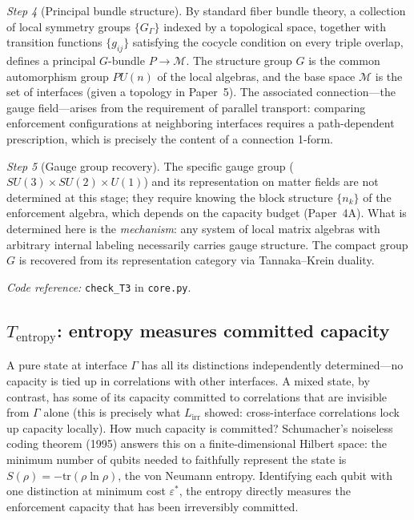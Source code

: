 \documentclass[11pt]{article}
\newcommand{\coderef}[2]{\smallskip\noindent\textit{Code reference:} \texttt{#1} in \texttt{#2}.}
\begin{document}
\begin{tcolorbox}[apfbox, title={T3: $L_{\mathrm{loc}}$ (Locality) $\to$ Gauge Structure}]
\textit{Step 4} (Principal bundle structure).  By standard fiber bundle theory, a collection of local symmetry groups $\{G_\Gamma\}$ indexed by a topological space, together with transition functions $\{g_{ij}\}$ satisfying the cocycle condition on every triple overlap, defines a principal $G$-bundle $P \to \mathcal{M}$.  The structure group $G$ is the common automorphism group $PU(n)$ of the local algebras, and the base space $\mathcal{M}$ is the set of interfaces (given a topology in Paper~5).  The associated connection---the gauge field---arises from the requirement of parallel transport: comparing enforcement configurations at neighboring interfaces requires a path-dependent prescription, which is precisely the content of a connection 1-form.

\textit{Step 5} (Gauge group recovery).  The specific gauge group ($SU(3) \times SU(2) \times U(1)$) and its representation on matter fields are not determined at this stage; they require knowing the block structure $\{n_k\}$ of the enforcement algebra, which depends on the capacity budget (Paper~4A).  What is determined here is the \emph{mechanism}: any system of local matrix algebras with arbitrary internal labeling necessarily carries gauge structure.  The compact group $G$ is recovered from its representation category via Tannaka--Krein duality.

\coderef{check\_T3}{core.py}
\end{tcolorbox}


\subsection{\texorpdfstring{$T_{\mathrm{entropy}}$}{T entropy}: entropy measures committed capacity}

A pure state at interface $\Gamma$ has all its distinctions independently determined---no capacity is tied up in correlations with other interfaces.  A mixed state, by contrast, has some of its capacity committed to correlations that are invisible from $\Gamma$ alone (this is precisely what $L_{\mathrm{irr}}$ showed: cross-interface correlations lock up capacity locally).  How much capacity is committed?  Schumacher's noiseless coding theorem (1995) answers this on a finite-dimensional Hilbert space: the minimum number of qubits needed to faithfully represent the state is $S(\rho) = -\mathrm{tr}(\rho \ln \rho)$, the von Neumann entropy.  Identifying each qubit with one distinction at minimum cost $\varepsilon^*$, the entropy directly measures the enforcement capacity that has been irreversibly committed.
\end{document}

